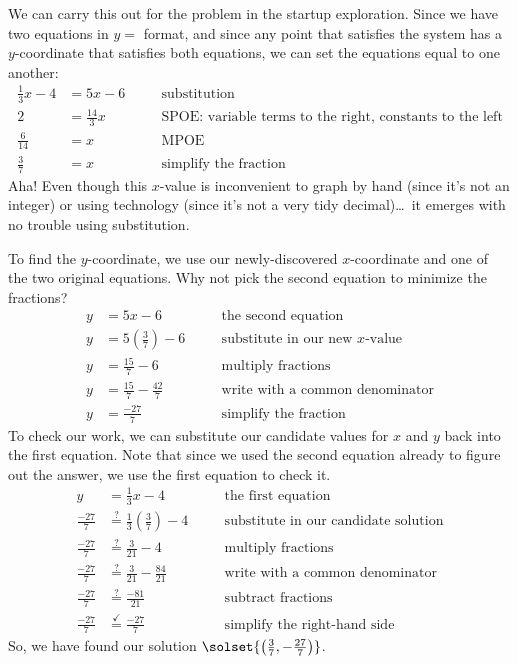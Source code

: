 We can carry this out for the problem in the startup exploration. Since we have two equations in $y=$ format, and since any point that satisfies the system has a $y$-coordinate that satisfies both equations, we can set the equations equal to one another:
\[\begin{aligned}
\frac{1}{3}x - 4 &= 5x - 6
&& \quad\text{substitution}\\[1ex]
2 &= \frac{14}{3}x
&& \quad\text{SPOE: variable terms to the right, constants to the left}\\[1ex]
\frac{6}{14} &= x
&& \quad\text{MPOE}\\[1ex]
\frac{3}{7} &= x
&& \quad\text{simplify the fraction}
\end{aligned}\]
Aha! Even though this $x$-value is inconvenient to graph by hand (since it's not an integer) or using technology (since it's not a very tidy decimal)\ldots\ it emerges with no trouble using substitution.

To find the $y$-coordinate, we use our newly-discovered $x$-coordinate and one of the two original equations. Why not pick the second equation to minimize the fractions?
\[\begin{aligned}
y &= 5x - 6
&& \quad\text{the second equation}\\[1ex]
y &= 5\left(\frac{3}{7}\right)-6
&& \quad\text{substitute in our new $x$-value}\\[1ex]
y &= \frac{15}{7} - 6
&& \quad\text{multiply fractions}\\[1ex]
y &= \frac{15}{7}-\frac{42}{7}
&& \quad\text{write with a common denominator}\\[1ex]
y &= \frac{-27}{7}
&& \quad\text{simplify the fraction}
\end{aligned}\]
To check our work, we can substitute our candidate values for $x$ and $y$ back into the first equation. Note that since we used the second equation already to figure out the answer, we use the first equation to check it.
\[\begin{aligned}
y &= \frac{1}{3}x - 4
&& \quad\text{the first equation}\\[1ex]
\frac{-27}{7} &\overset{?}{=} \frac{1}{3}\left(\frac{3}{7}\right)-4
&& \quad\text{substitute in our candidate solution}\\[1ex]
\frac{-27}{7} &\overset{?}{=} \frac{3}{21}-4
&& \quad\text{multiply fractions}\\[1ex]
\frac{-27}{7} &\overset{?}{=} \frac{3}{21}-\frac{84}{21}
&& \quad\text{write with a common denominator}\\[1ex]
\frac{-27}{7} &\overset{?}{=} \frac{-81}{21}
&& \quad\text{subtract fractions}\\[1ex]
\frac{-27}{7} &\overset{\checkmark}{=} \frac{-27}{7}
&& \quad\text{simplify the right-hand side}
\end{aligned}\]
So, we have found our solution $\solset{\left(\frac{3}{7}, -\frac{27}{7}\right)}$.

